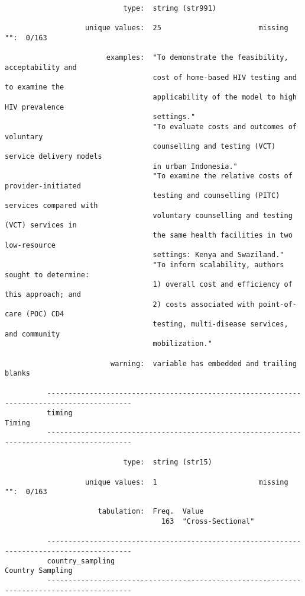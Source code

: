 \documentclass{article}
\begin{document}
\begin{verbatim}
                            type:  string (str991)
          
                   unique values:  25                       missing "":  0/163
          
                        examples:  "To demonstrate the feasibility, acceptability and
                                   cost of home-based HIV testing and to examine the
                                   applicability of the model to high HIV prevalence
                                   settings."
                                   "To evaluate costs and outcomes of voluntary
                                   counselling and testing (VCT) service delivery models
                                   in urban Indonesia."
                                   "To examine the relative costs of provider-initiated
                                   testing and counselling (PITC) services compared with
                                   voluntary counselling and testing (VCT) services in
                                   the same health facilities in two low-resource
                                   settings: Kenya and Swaziland."
                                   "To inform scalability, authors sought to determine:
                                   1) overall cost and efficiency of this approach; and
                                   2) costs associated with point-of-care (POC) CD4
                                   testing, multi-disease services, and community
                                   mobilization."
          
                         warning:  variable has embedded and trailing blanks
          
          ------------------------------------------------------------------------------------------
          timing                                                                              Timing
          ------------------------------------------------------------------------------------------
          
                            type:  string (str15)
          
                   unique values:  1                        missing "":  0/163
          
                      tabulation:  Freq.  Value
                                     163  "Cross-Sectional"
          
          ------------------------------------------------------------------------------------------
          country_sampling                                                          Country Sampling
          ------------------------------------------------------------------------------------------
          

\end{verbatim}
\end{document}
